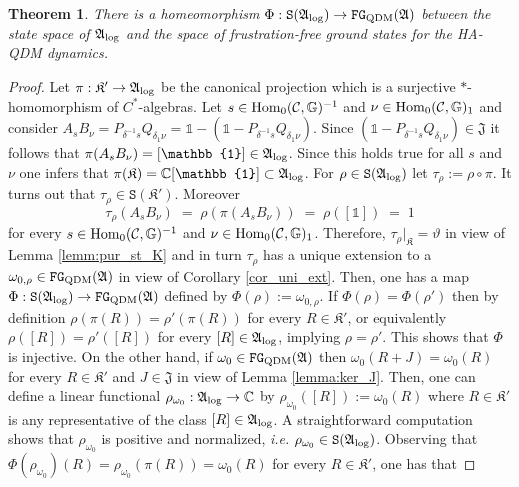 \documentclass[a4paper,12pt,twoside,reqno]{amsart}
\theoremstyle{plain}
\newtheorem{teo}{Theorem}[section]
\theoremstyle{definition}
\theoremstyle{remark}
\numberwithin{equation}{section}
\numberwithin{figure}{section}
\numberwithin{table}{section}
\newcommand{\f}[1]{\mathcal{#1}}
\newcommand{\n}[1]{\mathbb{#1}}
\begin{document}
	
	\begin{teo}\label{theo:one_on_one_bijection}
		There is a homeomorphism $\Phi:\mathtt{S}(\mathfrak{A}_{\rm log})\to\mathtt{FG}_{\rm QDM}(\mathfrak{A})$ between the state space of $\mathfrak{A}_{\rm log}$ and the
		space of frustration-free ground states for the {HA-QDM dynamics}.
	\end{teo}
	\begin{proof}
		Let $\pi:\mathfrak{K}'\to \mathfrak{A}_{\rm log}$ be the canonical 
		projection which is a surjective $\ast$-homomorphism of $C^*$-algebras.
		Let $s\in {\rm Hom}_0(\f{C},\n{G})^{-1}$ and $\nu\in {\rm Hom}_0(\f{C},\n{G})_{1}$ and consider $A_s B_\nu=P_{\delta^{-1}s}Q_{\delta_1\nu}=\n{1}-(\n{1}-P_{\delta^{-1}s}Q_{\delta_1\nu})$. Since
		$(\n{1}-P_{\delta^{-1}s}Q_{\delta_1\nu})\in \mathfrak{J}$ it follows that $\pi(A_s B_\nu)=[\n{1}]\in \mathfrak{A}_{\rm log}$. Since this holds true for all $s$ and $\nu$ one infers that $\pi(\mathfrak{K})=\n{C}[\n{1}]\subset\mathfrak{A}_{\rm log}$.  
		For ${\rho}\in \mathtt{S}(\mathfrak{A}_{\rm log})$ let  
		$\tau_\rho:=\rho\circ \pi$. It turns out that  $\tau_\rho\in\mathtt{S}(\mathfrak{K}')$. Moreover
		\[
		\tau_\rho(A_s B_\nu)\;=\;\rho(\pi(A_s B_\nu))\;=\;\rho([\n{1}])\;=\; 1
		\]
		for every $s\in {\rm Hom}_0(\f{C},\n{G})^{-1}$ and $\nu\in {\rm Hom}_0(\f{C},\n{G})_{1}$. Therefore, $\tau_\rho|_{\mathfrak{K}}=\vartheta$
		in view of Lemma \ref{lemm:pur_st_K} and in turn
		$\tau_\rho$ has a unique extension to a $\omega_{0,\rho}\in \mathtt{FG}_{\rm QDM}(\mathfrak{A})$ in view of Corollary \ref{cor_uni_ext}.
		Then, one has a map $\Phi:\mathtt{S}(\mathfrak{A}_{\rm log})\to \mathtt{FG}_{\rm QDM}(\mathfrak{A})$ defined by $\Phi(\rho):=\omega_{0,\rho}$. If $\Phi(\rho)=\Phi(\rho')$ then by definition
		$\rho(\pi(R))=\rho'(\pi(R))$ for every $R\in \mathfrak{K}'$, or equivalently $\rho([R])=\rho'([R])$ for every $[R]\in \mathfrak{A}_{\rm log}$, implying $\rho=\rho'$. This shows that $\Phi$ is injective. 
		On the other hand, if $\omega_0\in \mathtt{FG}_{\rm QDM}(\mathfrak{A})$
		then $\omega_0(R+J)=\omega_0(R)$ for every $R\in \mathfrak{K}'$ and 
		$J\in \mathfrak{J}$ in view of Lemma \ref{lemma:ker_J}.
		Then, one can define a linear functional $\rho_{\omega_0}:\mathfrak{A}_{\rm log}\to\n{C}$ by $\rho_{\omega_0}([R]):=\omega_0(R)$ where $R\in\mathfrak{K}'$ is any representative of the class $[R]\in \mathfrak{A}_{\rm log}$. A straightforward computation shows that 
		$\rho_{\omega_0}$ is positive and normalized, \emph{i.e.} $\rho_{\omega_0}\in \mathtt{S}(\mathfrak{A}_{\rm log})$.
		Observing that $\Phi(\rho_{\omega_0})(R)=\rho_{\omega_0}(\pi(R))=\omega_0(R)$ for every $R\in \mathfrak{K}'$, one has that

\end{proof}
\end{document}
